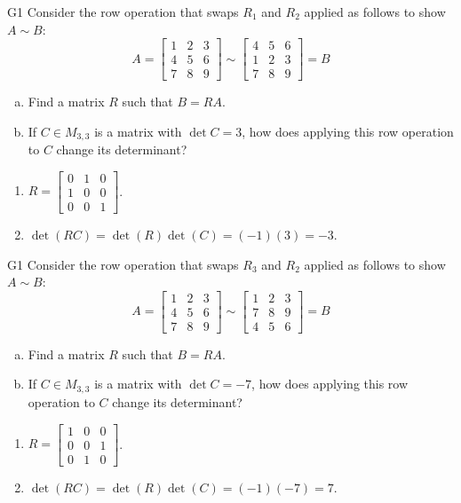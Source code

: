\begin{problem}{G1}
Consider the row operation that swaps \(R_1\) and \(R_2\) applied as follows to show
\(A\sim B\):
\[
A=\begin{bmatrix}1&2&3\\4&5&6\\7&8&9\end{bmatrix}
  \sim
\begin{bmatrix}4&5&6\\1&2&3\\7&8&9\end{bmatrix}=B
\]
\begin{enumerate}[(a)]
\item Find a matrix \(R\) such that \(B=RA\).
\item If \(C \in M_{3,3}\) is a matrix with \(\det C = 3\), how does applying this row operation to \(C\) change its determinant?
\end{enumerate}
\end{problem}
\begin{solution}
\begin{enumerate}
\item \(R= \begin{bmatrix} 0 & 1 & 0 \\ 1 & 0 & 0 \\ 0 & 0 & 1 \end{bmatrix}\).
\item \(\det(RC)= \det(R)\det(C)=(-1)(3)=-3\).
\end{enumerate}
\end{solution}

\begin{problem}{G1}
Consider the row operation that swaps \(R_3\) and \(R_2\) applied as follows to show
\(A\sim B\):
\[
A=\begin{bmatrix}1&2&3\\4&5&6\\7&8&9\end{bmatrix}
  \sim
\begin{bmatrix}1&2&3\\7&8&9\\4&5&6\end{bmatrix}=B
\]
\begin{enumerate}[(a)]
\item Find a matrix \(R\) such that \(B=RA\).
\item If \(C \in M_{3,3}\) is a matrix with \(\det C = -7\), how does applying this row operation to \(C\) change its determinant?
\end{enumerate}
\end{problem}
\begin{solution}
\begin{enumerate}
\item \(R= \begin{bmatrix} 1 & 0 & 0 \\ 0 & 0 & 1 \\ 0 & 1 & 0 \end{bmatrix}\).
\item \(\det(RC)= \det(R)\det(C)=(-1)(-7)=7\).
\end{enumerate}
\end{solution}

